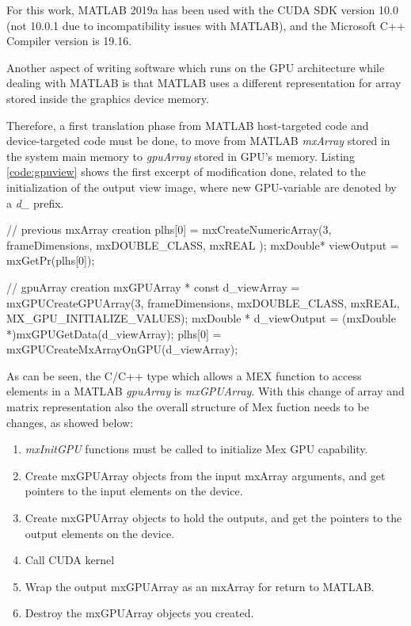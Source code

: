 \documentclass[12pt,a4paper]{extarticle}
\newcommand{\linespace}{\vspace{0pt}}
\begin{document}
For this work, MATLAB 2019a has been used with the CUDA SDK version 10.0 (not 10.0.1 due to incompatibility issues with MATLAB), and the Microsoft C++ Compiler version is 19.16.
\linespace

Another aspect of writing software which runs on the GPU architecture while dealing with MATLAB is that MATLAB uses a different representation for array stored inside the graphics device memory.

Therefore, a first translation phase from MATLAB host-targeted code and device-targeted code must be done, to move from MATLAB \textit{mxArray} stored in the system main memory to \textit{gpuArray} stored in GPU's memory. Listing \ref{code:gpuview} shows the first excerpt of modification done, related to the initialization of the output view image, where new GPU-variable are denoted by a \textit{d\_} prefix.

\begin{cpp}[caption={Output view image initialization code differences from mxArray and gpuArray.},label=code:gpuview]
// previous mxArray creation 
plhs[0] = mxCreateNumericArray(3, 
	frameDimensions, 
	mxDOUBLE_CLASS, 
	mxREAL
);
mxDouble* viewOutput = mxGetPr(plhs[0]);

// gpuArray creation
mxGPUArray * const  d_viewArray = mxGPUCreateGPUArray(3, 
	frameDimensions, 
	mxDOUBLE_CLASS, 
	mxREAL, 
	MX_GPU_INITIALIZE_VALUES);
mxDouble * d_viewOutput = (mxDouble *)mxGPUGetData(d_viewArray);
plhs[0] = mxGPUCreateMxArrayOnGPU(d_viewArray);
\end{cpp}

As can be seen, the C/C++ type which allows a MEX function to access elements in a MATLAB \textit{gpuArray} is \textit{mxGPUArray}. With this change of array and matrix representation also the overall structure of Mex fuction needs to be changes, as showed below:

\begin{enumerate}
\item \textit{mxInitGPU} functions must be called to initialize Mex GPU capability.
\item Create mxGPUArray objects from the input mxArray arguments, and get pointers to the input elements on the device.
\item Create mxGPUArray objects to hold the outputs, and get the pointers to the output elements on the device.
\item Call CUDA kernel 
\item Wrap the output mxGPUArray as an mxArray for return to MATLAB.
\item Destroy the mxGPUArray objects you created.
\end{enumerate}
\end{document}
